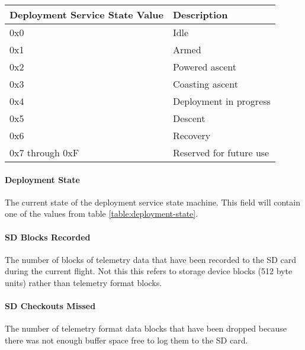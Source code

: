 \begin{table*}[htb]
    \centering
    \begin{tabular}{@{}ll@{}}
        \toprule
        Deployment Service State Value & Description             \\
        \midrule
        0x0                            & Idle                    \\
        0x1                            & Armed                   \\
        0x2                            & Powered ascent          \\
        0x3                            & Coasting ascent         \\
        0x4                            & Deployment in progress  \\
        0x5                            & Descent                 \\
        0x6                            & Recovery                \\
        0x7 through 0xF                & Reserved for future use \\
        \bottomrule
    \end{tabular}
    \caption{Deployment Service States}
    \label{table:deployment-state}
\end{table*}

\paragraph{Deployment State}
The current state of the deployment service state machine. This field will contain one of the values from table
\ref{table:deployment-state}.

\paragraph{SD Blocks Recorded}
The number of blocks of telemetry data that have been recorded to the SD card during the current flight. Not this this
refers to storage device blocks (512 byte units) rather than telemetry format blocks.

\paragraph{SD Checkouts Missed}
The number of telemetry format data blocks that have been dropped because there was not enough buffer space free to log
them to the SD card.
